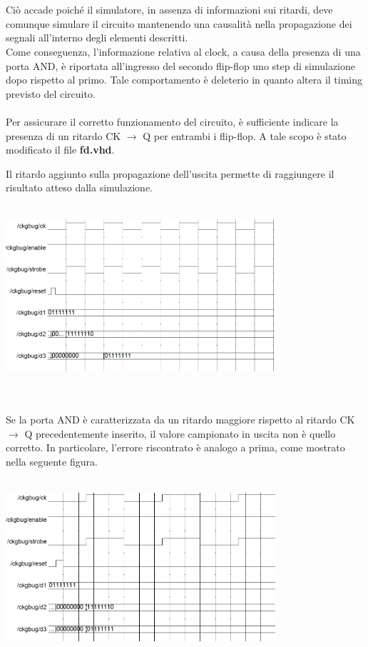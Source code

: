 \documentclass[11pt,  english, makeidx, a4paper, titlepage, oneside]{book}
\newenvironment{listato}{\footnotesize} {\normalsize }
\begin{document}
\\\\
Ciò accade poiché il simulatore, in assenza di informazioni sui ritardi, deve comunque simulare il circuito mantenendo una causalità nella propagazione dei segnali all'interno degli elementi descritti.
\\
Come conseguenza, l'informazione relativa al clock, a causa della presenza di una porta AND, è riportata all'ingresso del secondo flip-flop uno step di simulazione dopo rispetto al primo. Tale comportamento è deleterio in quanto altera il timing previsto del circuito.
\\\\
Per assicurare il corretto funzionamento del circuito, è sufficiente indicare la presenza di un ritardo CK $\rightarrow$ Q per entrambi i flip-flop. A tale scopo è stato modificato il file \textbf{fd.vhd}.
\begin{center}
\begin{listato}
	\centerline{}
\end{listato}
\end{center}
Il ritardo aggiunto sulla propagazione dell'uscita permette di raggiungere il risultato atteso dalla simulazione.
\\\\
\centerline{\includegraphics[width=10cm]{./img/Lab_3/clk_bug_resolved.png}}
\\\\
Se la porta AND è caratterizzata da un ritardo maggiore rispetto al ritardo CK $\rightarrow$ Q precedentemente inserito, il valore campionato in uscita non è quello corretto. In particolare, l'errore riscontrato è analogo a prima, come mostrato nella seguente figura.
\\\\
\centerline{\includegraphics[width=10cm]{./img/Lab_3/clk_bug_delay.png}}
\newpage
\end{document}
